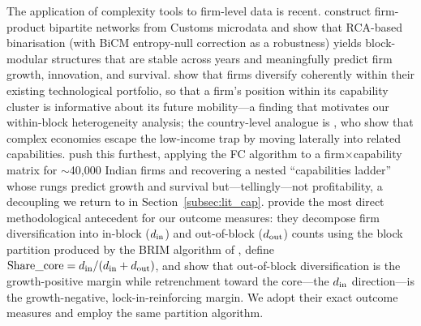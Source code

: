 The application of complexity tools to firm-level data is recent. \citet{bruno2018, bruno2023} construct firm-product bipartite
networks from Customs microdata and show that RCA-based binarisation
(with BiCM entropy-null correction as a robustness) yields block-modular structures
that are stable across years and meaningfully predict firm growth, innovation, and
survival. \citet{pugliese2019} show that firms diversify coherently within their
existing technological portfolio, so that a firm's position within its capability
cluster is informative about its future mobility---a finding that motivates our
within-block heterogeneity analysis; the country-level analogue is \citet{pugliese2017},
who show that complex economies escape the low-income trap by moving laterally into
related capabilities. \citet{coad2021} push
this furthest, applying the FC algorithm to a firm$\times$capability matrix for $\sim$40{,}000
Indian firms and recovering a nested ``capabilities ladder'' whose rungs predict growth
and survival but---tellingly---not profitability, a decoupling we return to in
Section~\ref{subsec:lit_cap}. \citet{destefano2025}
provide the most direct methodological antecedent for our outcome measures: they
decompose firm diversification into in-block ($d_{\rm in}$) and out-of-block
($d_{\rm out}$) counts using the block partition produced by the BRIM algorithm of
\citet{barber2007}, define $\text{Share\_core} = d_{\rm in}/(d_{\rm in}+d_{\rm out})$,
and show that out-of-block diversification is the growth-positive margin while
retrenchment toward the core---the $d_{\rm in}$ direction---is the
growth-negative, lock-in-reinforcing margin. We adopt their exact outcome measures
and employ the same partition algorithm.

